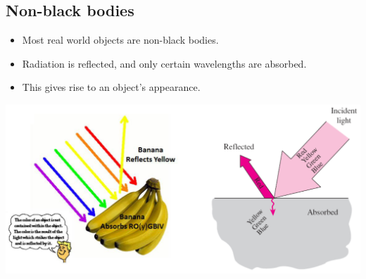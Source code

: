 \documentclass[11pt]{article}
\begin{document}
\subsection{Non-black bodies}
\label{sec:orgb801d1e}
\begin{itemize}
\item Most real world objects are non-black bodies.
\item Radiation is reflected, and only certain wavelengths are absorbed.
\item This gives rise to an object's appearance.
\end{itemize}

\begin{center}
\includegraphics[width=.9\linewidth]{./images/non-black-bodies-diagram.png}
\end{center}
\end{document}
